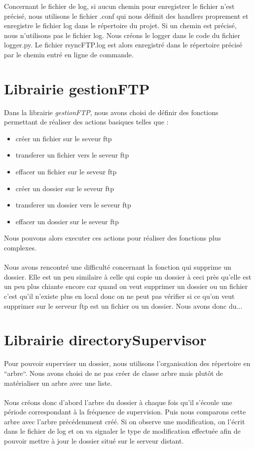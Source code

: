 Concernant le fichier de log, si aucun chemin pour enregistrer le fichier n'est précisé, nous utilisons le fichier .conf qui nous définit des handlers proprement et enregistre le fichier log dans le répertoire du projet.
Si un chemin est précisé, nous n'utilisons pas le fichier log. Nous créons le logger dans le code du fichier logger.py. Le fichier rsyncFTP.log est alors enregistré dans le répertoire précisé par le chemin entré en ligne de commande.


\section{Librairie gestionFTP}

Dans la librairie \textit{gestionFTP}, nous avons choisi de définir des fonctions permettant de réaliser des actions basiques telles que : 
\begin{itemize}
\item créer un fichier sur le seveur ftp
\item transferer un fichier vers le seveur ftp
\item effacer un fichier sur le seveur ftp
\item créer un dossier sur le seveur ftp
\item transferer un dossier vers le seveur ftp
\item effacer un dossier sur le seveur ftp
\end{itemize}

Nous pouvons alors executer ces actions pour réaliser des fonctions plus complexes.\\
\\
Nous avons rencontré une difficulté concernant la fonction qui supprime un dossier. 
Elle est un peu similaire à celle qui copie un dossier à ceci près qu'elle est un peu plus chiante encore car quand 
on veut supprimer un dossier ou un fichier c'est qu'il n'existe plus en local donc on ne peut pas vérifier si ce 
qu'on veut supprimer sur le serveur ftp est un fichier ou un dossier. Nous avons donc du...


\section{Librairie directorySupervisor}

Pour pouvoir superviser un dossier, nous utilisons l'organisation des répertoire en ``arbre``.
Nous avons choisi de ne pas créer de classe arbre mais plutôt de matérialiser un arbre avec une liste.\\
\\
Nous créons donc d'abord l'arbre du dossier à chaque fois qu'il s'écoule une période correspondant à la fréquence de supervision. 
Puis nous comparons cette arbre avec l'arbre précédemment créé. 
Si on observe une modification, on l'écrit dans le fichier de log et on va signaler le type de modification effectuée afin de pouvoir mettre à jour le dossier situé sur le serveur distant.\\
\\




